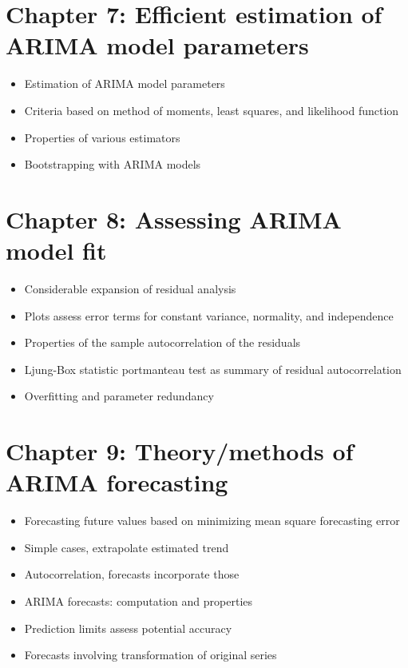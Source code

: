 \documentclass[12pt]{article}
\begin{document}
\section*{Chapter 7: Efficient estimation of ARIMA model parameters}
\label{sec-7}

\begin{itemize}
\item Estimation of ARIMA model parameters
\item Criteria based on method of moments, least squares, and likelihood function
\item Properties of various estimators
\item Bootstrapping with ARIMA models
\end{itemize}
\section*{Chapter 8: Assessing ARIMA model fit}
\label{sec-8}

\begin{itemize}
\item Considerable expansion of residual analysis
\item Plots assess error terms for constant variance, normality, and independence
\item Properties of the sample autocorrelation of the residuals
\item Ljung-Box statistic portmanteau test as summary of residual autocorrelation
\item Overfitting and parameter redundancy
\end{itemize}
\section*{Chapter 9: Theory/methods of ARIMA forecasting}
\label{sec-9}

\begin{itemize}
\item Forecasting future values based on minimizing mean square forecasting error
\item Simple cases, extrapolate estimated trend
\item Autocorrelation, forecasts incorporate those
\item ARIMA forecasts: computation and properties
\item Prediction limits assess potential accuracy
\item Forecasts involving transformation of original series
\end{itemize}
\end{document}

